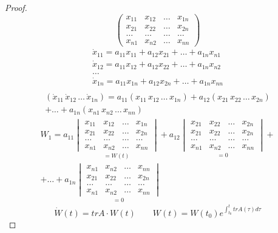 \documentclass{article}
\begin{document}
\begin{proof}
\[\begin{pmatrix}
      {x}_{11} & {x}_{12} & \dots & {x}_{1n} \\
      {x}_{21} & {x}_{22} & \dots & {x}_{2n} \\
      \dots & \dots & \dots & \dots \\
      {x}_{n1} & {x}_{n2} & \dots & {x}_{nn}
    \end{pmatrix}
  \]
  \begin{gather*}
    \dot{x}_{11}=a_{11}x_{11}+a_{12}x_{21}+\dots+a_{1n}x_{n1} \\
    \dot{x}_{12}=a_{11}x_{12}+a_{12}x_{22}+\dots+a_{1n}x_{n2} \\
    \dots \\
    \dot{x}_{1n}=a_{11}x_{1n}+a_{12}x_{2n}+\dots+a_{1n}x_{nn} \\
  \end{gather*}
  \begin{gather*}
    (\dot{x}_{11} \, \dot{x}_{12} \, \dots \, \dot{x}_{1n})=
    a_{11}(x_{11}\, x_{12} \, \dots \, x_{1n}) + a_{12}(x_{21}\, x_{22} \, \dots \, x_{2n}) \\
    + \dots + a_{1n}(x_{n1}\, x_{n2} \, \dots \, x_{nn})
  \end{gather*}
  \begin{gather*}
    W_1 = a_{11} \underset{=W(t)}{\begin{vmatrix}
      {x}_{11} & {x}_{12} & \dots & {x}_{1n} \\
      {x}_{21} & {x}_{22} & \dots & {x}_{2n} \\
      \dots & \dots & \dots & \dots \\
      {x}_{n1} & {x}_{n2} & \dots & {x}_{nn}
  \end{vmatrix}}
  + a_{12} \underset{=0}{\begin{vmatrix}
      {x}_{21} & {x}_{22} & \dots & {x}_{2n} \\
      {x}_{21} & {x}_{22} & \dots & {x}_{2n} \\
      \dots & \dots & \dots & \dots \\
      {x}_{n1} & {x}_{n2} & \dots & {x}_{nn}
  \end{vmatrix}} + \\
    + \dots
    + a_{1n} \underset{=0}{\begin{vmatrix}
      {x}_{n1} & {x}_{n2} & \dots & {x}_{nn} \\
      {x}_{21} & {x}_{22} & \dots & {x}_{2n} \\
      \dots & \dots & \dots & \dots \\
      {x}_{n1} & {x}_{n2} & \dots & {x}_{nn}
  \end{vmatrix}}
  \end{gather*}
  \[
    \dot{W}(t)=trA\cdot W(t) \qquad W(t)=W(t_0)e^{\int_{t_0}^{t}trA(\tau)d\tau}
  \]
\end{proof}
\end{document}
